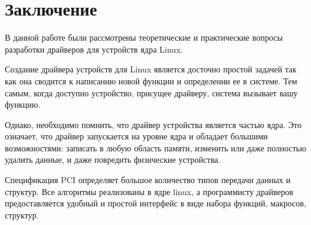 \newpage
\section*{Заключение}

В данной работе были рассмотрены теоретические и практические вопросы разработки драйверов для устройств ядра Linux.

Создание драйвера устройств для Linux является досточно простой задачей так как она сводится к написанию новой функции и определении ее в системе. Тем самым, когда доступно устройство, присущее драйверу, система вызывает вашу функцию.

Однако, необходимо помнить, что драйвер устройства является частью ядра. Это означает, что драйвер запускается на уровне ядра и обладает большими возможностями: записать в любую область памяти, изменить или даже полностью удалить данные, и даже повредить физические устройства. 

Спецификация  PCI определяет большое количество типов передачи данных и структур.  Все  алгоритмы реализованы в ядре linux, а программисту драйверов  предоставляется удобный и простой интерфейс в виде  набора  функций, макросов, структур.